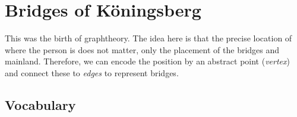\section{Bridges of Köningsberg}\par
\noindent This was the birth of graphtheory. The idea here is that the precise location of where the person is does not matter, only the placement of the bridges and mainland. Therefore, we can encode the position by an abstract point (\textit{vertex})  and connect these to \textit{edges} to represent bridges.
\par\bigskip
\subsection{Vocabulary}\hfill\\\par

